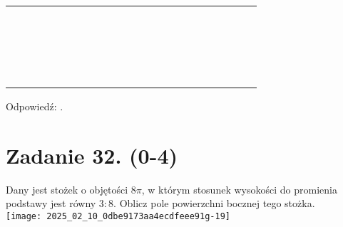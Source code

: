 \documentclass[10pt]{article}
\begin{document}
\begin{center}
\begin{tabular}{|c|c|c|c|c|c|c|c|c|c|c|c|c|c|c|c|c|c|c|c|c|c|}
\hline
 &  &  &  &  &  &  &  &  &  &  &  &  &  &  &  &  &  &  &  &  &  \\
\hline
 &  &  &  &  &  &  &  &  &  &  &  &  &  &  &  &  &  &  &  &  &  \\
\hline
 &  &  &  &  &  &  &  &  &  &  &  &  &  &  &  &  &  &  &  &  &  \\
\hline
 &  &  &  &  &  &  &  &  &  &  &  &  &  &  &  &  &  &  &  &  &  \\
\hline
 &  &  &  &  &  &  &  &  &  &  &  &  &  &  &  &  &  &  &  &  &  \\
\hline
 &  &  &  &  &  &  &  &  &  &  &  &  &  &  &  &  &  &  &  &  &  \\
\hline
 &  &  &  &  &  &  &  &  &  &  &  &  &  &  &  &  &  &  &  &  &  \\
\hline
 &  &  &  &  &  &  &  &  &  &  &  &  &  &  &  &  &  &  &  &  &  \\
\hline
 &  &  &  &  &  &  &  &  &  &  &  &  &  &  &  &  &  &  &  &  &  \\
\hline
 &  &  &  &  &  &  &  &  &  &  &  &  &  &  &  &  &  &  &  &  &  \\
\hline
 &  &  &  &  &  &  &  &  &  &  &  &  &  &  &  &  &  &  &  &  &  \\
\hline
 &  &  &  &  &  &  &  &  &  &  &  &  &  &  &  &  &  &  &  &  &  \\
\hline
 &  &  &  &  &  &  &  &  &  &  &  &  &  &  &  &  &  &  &  &  &  \\
\hline
 &  &  &  &  &  &  &  &  &  &  &  &  &  &  &  &  &  &  &  &  &  \\
\hline
 &  &  &  &  &  &  &  &  &  &  &  &  &  &  &  &  &  &  &  &  &  \\
\hline
 &  &  &  &  &  &  &  &  &  &  &  &  &  &  &  &  &  &  &  &  &  \\
\hline
 &  &  &  &  &  &  &  &  &  &  &  &  &  &  &  &  &  &  &  &  &  \\
\hline
 &  &  &  &  &  &  &  &  &  &  &  &  &  &  &  &  &  &  &  &  &  \\
\hline
 &  &  &  &  &  &  &  &  &  &  &  &  &  &  &  &  &  &  &  &  &  \\
\hline
 &  &  &  &  &  &  &  &  &  &  &  &  &  &  &  &  &  &  &  &  &  \\
\hline
\end{tabular}
\end{center}

Odpowiedź: .

\section*{Zadanie 32. (0-4)}
Dany jest stożek o objętości \(8 \pi\), w którym stosunek wysokości do promienia podstawy jest równy \(3: 8\). Oblicz pole powierzchni bocznej tego stożka.\\
\texttt{[image: 2025\_02\_10\_0dbe9173aa4ecdfeee91g-19]}
\end{document}
